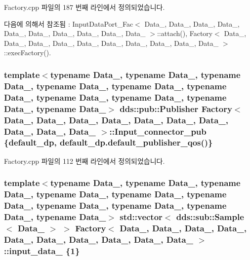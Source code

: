 Factory.\+cpp 파일의 187 번째 라인에서 정의되었습니다.



다음에 의해서 참조됨 \+:  Input\+Data\+Port\+\_\+\+Fac$<$ Data\+\_, Data\+\_, Data\+\_, Data\+\_, Data\+\_, Data\+\_, Data\+\_, Data\+\_, Data\+\_, Data\+\_ $>$\+::attach(), Factory$<$ Data\+\_, Data\+\_, Data\+\_, Data\+\_, Data\+\_, Data\+\_, Data\+\_, Data\+\_, Data\+\_, Data\+\_ $>$\+::exec\+Factory().

\subsubsection[{\texorpdfstring{Input\+\_\+connector\+\_\+pub}{Input_connector_pub}}]{\setlength{\rightskip}{0pt plus 5cm}template$<$typename Data\+\_, typename Data\+\_, typename Data\+\_, typename Data\+\_, typename Data\+\_, typename Data\+\_, typename Data\+\_, typename Data\+\_, typename Data\+\_, typename Data\+\_$>$ dds\+::pub\+::\+Publisher {\bf Factory}$<$ Data\+\_, Data\+\_, Data\+\_, Data\+\_, Data\+\_, Data\+\_, Data\+\_, Data\+\_, Data\+\_, Data\+\_ $>$\+::Input\+\_\+connector\+\_\+pub \{{\bf default\+\_\+dp}, default\+\_\+dp.\+default\+\_\+publisher\+\_\+qos()\}}\hypertarget{classFactory_a0fa1e401cba8537d6aff6a5b1ef34637}{}\label{classFactory_a0fa1e401cba8537d6aff6a5b1ef34637}


Factory.\+cpp 파일의 112 번째 라인에서 정의되었습니다.

\subsubsection[{\texorpdfstring{input\+\_\+data\+\_\+1}{input_data_1}}]{\setlength{\rightskip}{0pt plus 5cm}template$<$typename Data\+\_, typename Data\+\_, typename Data\+\_, typename Data\+\_, typename Data\+\_, typename Data\+\_, typename Data\+\_, typename Data\+\_, typename Data\+\_, typename Data\+\_$>$ std\+::vector$<$ dds\+::sub\+::\+Sample$<$ Data\+\_ $>$ $>$ {\bf Factory}$<$ Data\+\_, Data\+\_, Data\+\_, Data\+\_, Data\+\_, Data\+\_, Data\+\_, Data\+\_, Data\+\_, Data\+\_ $>$\+::input\+\_\+data\+\_ \{1\}}\hypertarget{classFactory_a126e4ae222ac36e61cb29c93d7b375b3}{}\label{classFactory_a126e4ae222ac36e61cb29c93d7b375b3}


